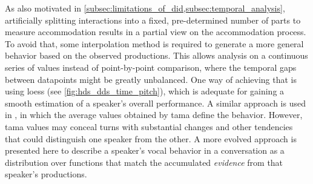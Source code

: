 As also motivated in \cref{subsec:limitations_of_did,subsec:temporal_analysis}, artificially splitting interactions into a fixed, pre-determined number of parts to measure accommodation results in a partial view on the accommodation process.
To avoid that, some interpolation method is required to generate a more general behavior based on the observed productions.
This allows analysis on a continuous series of values instead of point-by-point comparison, where the temporal gaps between datapoints might be greatly unbalanced.
One way of achieving that is using \ac{loess} (see \cref{fig:hds_dds_time_pitch}), which is adequate for gaining a smooth estimation of a speaker's overall performance.
A similar approach is used in \citet{Galvez2020unifiying}, in which the average values obtained by \acl{tama} \citep[\acs{tama};][]{Kousidis2008towards, Kousidis2009monitoring} define the behavior.
However, \ac{tama} values may conceal turns with substantial changes and other tendencies that could distinguish one speaker from the other.
A more evolved approach is presented here to describe a speaker's vocal behavior in a conversation as a distribution over functions that match the accumulated \textit{evidence} from that speaker's productions.

